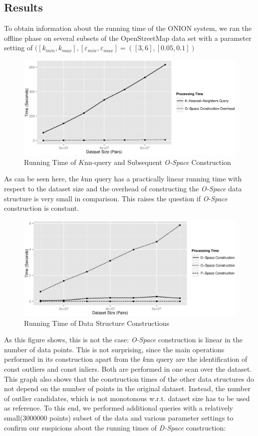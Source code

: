 \documentclass[runningheads]{llncs}
\begin{document}
\subsection{Results}
To obtain information about the running time of the ONION system, we ran the offline phase on several subsets of the OpenStreetMap data set with a parameter setting of $([k_{min},k_{max}],[\varepsilon_{min},\varepsilon_{max}] = ([3,6],[0.05,0.1])$
\begin{figure}[h]
\includegraphics[width=\textwidth]{images/ospace_vs_knn.eps}
\caption{Running Time of $K$nn-query and Subsequent \emph{O-Space} Construction}
\end{figure}

As can be seen here, the $k$nn query has a practically linear running time with respect to the dataset size and the overhead of constructing the \emph{O-Space} data structure is very small in comparison. This raises the question if \emph{O-Space} construction is constant.


\begin{figure}[H]
\includegraphics[width=\textwidth]{images/spaces_construction.eps}
\caption{Running Time of Data Structure Constructions}
\end{figure}

As this figure shows, this is not the case: \emph{O-Space} construction is linear in the number of data points. This is not surprising, since the main operations performed in its construction apart from the $k$nn query are the identification of const outliers and const inliers. Both are performed in one scan over the dataset.
This graph also shows that the construction times of the other data structures do not depend on the number of points in the original dataset. Instead, the number of outlier candidates, which is not monotonous w.r.t. dataset size has to be used as reference. To this end, we performed additional queries with a relatively small(3000000 points) subset of the data and various parameter settings to confirm our suspicions about the running times of \emph{D-Space} construction:
\end{document}
